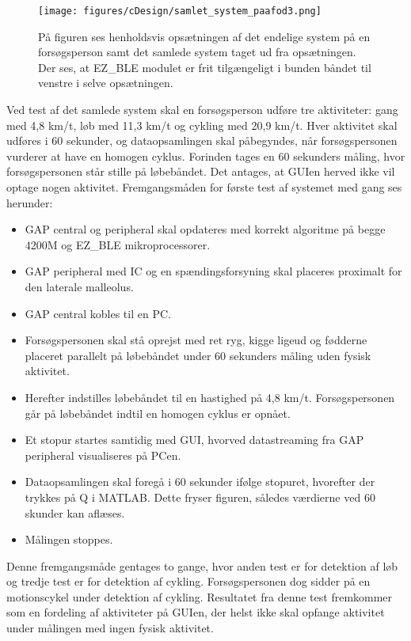 \begin{figure}[H]
	\centering
	\texttt{[image: figures/cDesign/samlet\_system\_paafod3.png]}
	\caption{På figuren ses henholdsvis opsætningen af det endelige system på en forsøgsperson samt det samlede system taget ud fra opsætningen. Der ses, at EZ\_BLE modulet er frit tilgængeligt i bunden båndet til venstre i selve opsætningen.}
	\label{fig:samlede_system_opstilling}
\end{figure}
Ved test af det samlede system skal en forsøgsperson udføre tre aktiviteter: gang med 4,8 km/t, løb med 11,3 km/t og cykling med 20,9 km/t. Hver aktivitet skal udføres i 60 sekunder, og dataopsamlingen skal påbegyndes, når forsøgspersonen vurderer at have en homogen cyklus. Forinden tages en 60 sekunders måling, hvor forsøgspersonen står stille på løbebåndet. Det antages, at GUIen herved ikke vil optage nogen aktivitet. Fremgangsmåden for første test af systemet med gang ses herunder: 
\begin{itemize}
	\item GAP central og peripheral skal opdateres med korrekt algoritme på begge 4200M og EZ\_BLE mikroprocessorer.
	\item GAP peripheral med IC og en spændingsforsyning skal placeres proximalt for den laterale malleolus.
	\item GAP central kobles til en PC. 
	\item Forsøgspersonen skal stå oprejst med ret ryg, kigge ligeud og fødderne placeret parallelt på løbebåndet under 60 sekunders måling uden fysisk aktivitet.
	\item Herefter indstilles løbebåndet til en hastighed på 4,8 km/t. Forsøgspersonen går på løbebåndet indtil en homogen cyklus er opnået.  
	\item Et stopur startes samtidig med GUI, hvorved datastreaming fra GAP peripheral visualiseres på PCen.
	\item Dataopsamlingen skal foregå i 60 sekunder ifølge stopuret, hvorefter der trykkes på Q i MATLAB. Dette fryser figuren, således værdierne ved 60 skunder kan aflæses.
	\item Målingen stoppes.
\end{itemize}
Denne fremgangsmåde gentages to gange, hvor anden test er for detektion af løb og tredje test er for detektion af cykling. Forsøgspersonen dog sidder på en motionscykel under detektion af cykling. Resultatet fra denne test fremkommer som en fordeling af aktiviteter på GUIen, der helst ikke skal opfange aktivitet under målingen med ingen fysisk aktivitet. \\
